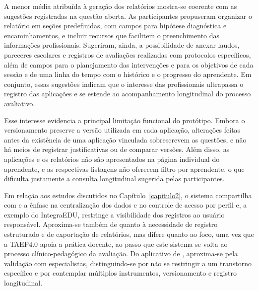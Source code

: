 A menor média atribuída à geração dos relatórios mostra-se coerente com as sugestões registradas na questão aberta. As participantes propuseram organizar o relatório em seções predefinidas, com campos para hipótese diagnóstica e encaminhamentos, e incluir recursos que facilitem o preenchimento das informações profissionais. Sugeriram, ainda, a possibilidade de anexar laudos, pareceres escolares e registros de avaliações realizadas com protocolos específicos, além de campos para o planejamento das intervenções e para os objetivos de cada sessão e de uma linha do tempo com o histórico e o progresso do aprendente. Em conjunto, essas sugestões indicam que o interesse das profissionais ultrapassa o registro das aplicações e se estende ao acompanhamento longitudinal do processo avaliativo.

Esse interesse evidencia a principal limitação funcional do protótipo. Embora o versionamento preserve a versão utilizada em cada aplicação, alterações feitas antes da existência de uma aplicação vinculada sobrescrevem as questões, e não há meios de registrar justificativas ou de comparar versões. Além disso, as aplicações e os relatórios não são apresentados na página individual do aprendente, e as respectivas listagens não oferecem filtro por aprendente, o que dificulta justamente a consulta longitudinal sugerida pelas participantes.

Em relação aos estudos discutidos no Capítulo~\ref{capitulo2}, o sistema compartilha com  e  a ênfase na centralização dos dados e no controle de acesso por perfil e, a exemplo do IntegraEDU, restringe a visibilidade dos registros ao usuário responsável. Aproxima-se também de  quanto à necessidade de registro estruturado e de exportação de relatórios, mas difere quanto ao foco, uma vez que a TAEP4.0 apoia a prática docente, ao passo que este sistema se volta ao processo clínico-pedagógico da avaliação. Do aplicativo de , aproxima-se pela validação com especialistas, distinguindo-se por não se restringir a um transtorno específico e por contemplar múltiplos instrumentos, versionamento e registro longitudinal.

